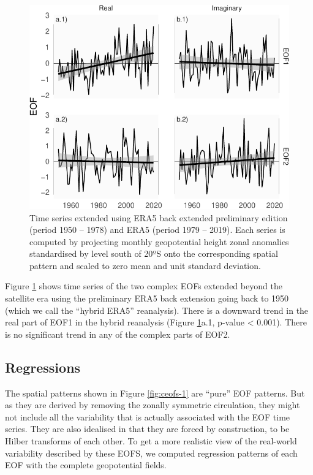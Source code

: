 \documentclass[smallextended]{svjour3}       %
\begin{document}
\begin{figure}
\centering
\includegraphics{../figures/extended-series-1.pdf}
\caption{\label{fig:extended-series}Time series extended using ERA5 back extended preliminary edition (period 1950 -- 1978) and ERA5 (period 1979 -- 2019). Each series is computed by projecting monthly geopotential height zonal anomalies standardised by level south of 20ºS onto the corresponding spatial pattern and scaled to zero mean and unit standard deviation.}
\end{figure}

Figure \ref{fig:extended-series} shows time series of the two complex EOFs extended beyond the satellite era using the preliminary ERA5 back extension going back to 1950 (which we call the ``hybrid ERA5'' reanalysis). There is a downward trend in the real part of EOF1 in the hybrid reanalysis (Figure \ref{fig:extended-series}a.1, p-value \textless{} 0.001). There is no significant trend in any of the complex parts of EOF2.

\hypertarget{regressions}{%
\subsection{Regressions}\label{regressions}}

The spatial patterns shown in Figure \ref{fig:ceofs-1} are ``pure'' EOF patterns. But as they are derived by removing the zonally symmetric circulation, they might not include all the variability that is actually associated with the EOF time series. They are also idealised in that they are forced by construction, to be Hilber transforms of each other. To get a more realistic view of the real-world variability described by these EOFS, we computed regression patterns of each EOF with the complete geopotential fields.
\end{document}
